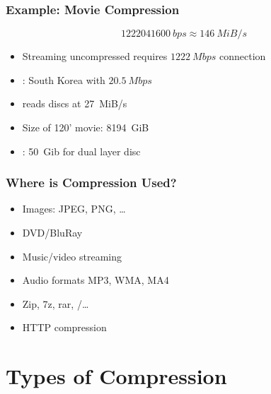 \begin{frame}
  \frametitle{Example: Movie Compression}
  \[
    \SI{1222041600}{bps} \approx \SI{146}{MiB/s}
  \]
  \vskip5mm
  \begin{itemize}
  \item Streaming uncompressed requires $\SI{1222}{Mbps}$ connection
    \item {}: South Korea with $\SI{20.5}{Mbps}$
  \end{itemize}
  \vskip5mm
  \begin{itemize}
    \item {} reads discs at \SI{27}{MiB/s}
    \item Size of 120' movie: \SI{8194}{GiB}
    \item {}: \SI{50}{Gib} for dual layer disc
  \end{itemize}
\end{frame}

\begin{frame}
  \frametitle{Where is Compression Used?}
  \begin{itemize}
    \item Images: JPEG, PNG, \dots
    \item DVD/BluRay
    \item Music/video streaming
    \item Audio formats MP3, WMA, MA4
    \item Zip, 7z, rar, /\dots
    \item HTTP compression
  \end{itemize}
\end{frame}

\section{Types of Compression}

\frame{\tableofcontents[currentsection]}

